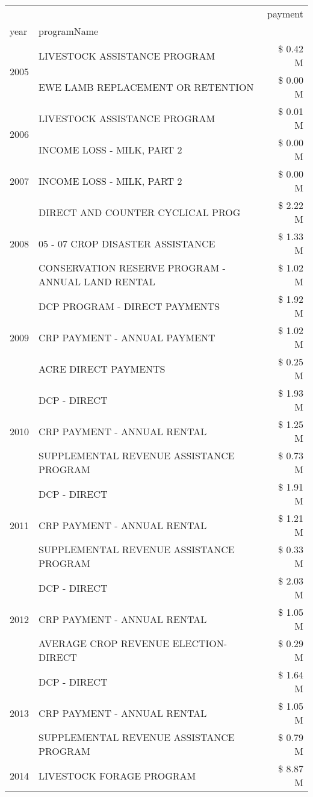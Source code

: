 \begin{tabular}{llr}
\toprule
 &  & payment \\
year & programName &  \\
\midrule
\multirow[t]{2}{*}{2005} & LIVESTOCK ASSISTANCE PROGRAM & \$ 0.42 M \\
 & EWE LAMB REPLACEMENT OR RETENTION & \$ 0.00 M \\
\cline{1-3}
\multirow[t]{2}{*}{2006} & LIVESTOCK ASSISTANCE PROGRAM & \$ 0.01 M \\
 & INCOME LOSS - MILK, PART 2 & \$ 0.00 M \\
\cline{1-3}
2007 & INCOME LOSS - MILK, PART 2 & \$ 0.00 M \\
\cline{1-3}
\multirow[t]{3}{*}{2008} & DIRECT AND COUNTER CYCLICAL PROG & \$ 2.22 M \\
 & 05 - 07 CROP DISASTER ASSISTANCE & \$ 1.33 M \\
 & CONSERVATION RESERVE PROGRAM - ANNUAL LAND RENTAL & \$ 1.02 M \\
\cline{1-3}
\multirow[t]{3}{*}{2009} & DCP PROGRAM - DIRECT PAYMENTS & \$ 1.92 M \\
 & CRP PAYMENT - ANNUAL PAYMENT & \$ 1.02 M \\
 & ACRE DIRECT PAYMENTS & \$ 0.25 M \\
\cline{1-3}
\multirow[t]{3}{*}{2010} & DCP - DIRECT & \$ 1.93 M \\
 & CRP PAYMENT - ANNUAL RENTAL & \$ 1.25 M \\
 & SUPPLEMENTAL REVENUE ASSISTANCE PROGRAM & \$ 0.73 M \\
\cline{1-3}
\multirow[t]{3}{*}{2011} & DCP - DIRECT & \$ 1.91 M \\
 & CRP PAYMENT - ANNUAL RENTAL & \$ 1.21 M \\
 & SUPPLEMENTAL REVENUE ASSISTANCE PROGRAM & \$ 0.33 M \\
\cline{1-3}
\multirow[t]{3}{*}{2012} & DCP - DIRECT & \$ 2.03 M \\
 & CRP PAYMENT - ANNUAL RENTAL & \$ 1.05 M \\
 & AVERAGE CROP REVENUE ELECTION-DIRECT & \$ 0.29 M \\
\cline{1-3}
\multirow[t]{3}{*}{2013} & DCP - DIRECT & \$ 1.64 M \\
 & CRP PAYMENT - ANNUAL RENTAL & \$ 1.05 M \\
 & SUPPLEMENTAL REVENUE ASSISTANCE PROGRAM & \$ 0.79 M \\
\cline{1-3}
\multirow[t]{3}{*}{2014} & LIVESTOCK FORAGE PROGRAM & \$ 8.87 M \\

\end{tabular}
